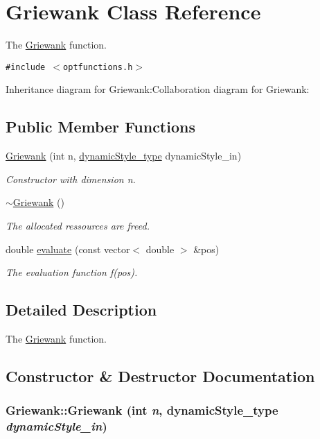 \hypertarget{classGriewank}{
\section{Griewank Class Reference}
\label{classGriewank}
}
The \hyperlink{classGriewank}{Griewank} function.  


{\tt \#include $<$optfunctions.h$>$}

Inheritance diagram for Griewank:Collaboration diagram for Griewank:\subsection*{Public Member Functions}
\begin{CompactItemize}
\item 
\hyperlink{classGriewank_2a659f93f0b1da7fc9fca34fc371d3af}{Griewank} (int n, \hyperlink{optfunctions_8h_ae9aa3a5dd199a43e77abc2cccf4477e}{dynamicStyle\_\-type} dynamicStyle\_\-in)
\begin{CompactList}\small\item\em Constructor with dimension n. \item\end{CompactList}\item 
\hyperlink{classGriewank_f635212f9d2c41fe20b00c474e461743}{$\sim$Griewank} ()
\begin{CompactList}\small\item\em The allocated ressources are freed. \item\end{CompactList}\item 
double \hyperlink{classGriewank_05917918e68b34e9ed3e794388975f6c}{evaluate} (const vector$<$ double $>$ \&pos)
\begin{CompactList}\small\item\em The evaluation function f(pos). \item\end{CompactList}\end{CompactItemize}


\subsection{Detailed Description}
The \hyperlink{classGriewank}{Griewank} function. 

\subsection{Constructor \& Destructor Documentation}
\hypertarget{classGriewank_2a659f93f0b1da7fc9fca34fc371d3af}{
\subsubsection{\setlength{\rightskip}{0pt plus 5cm}Griewank::Griewank (int {\em n}, \/  {\bf dynamicStyle\_\-type} {\em dynamicStyle\_\-in})}}
\label{classGriewank_2a659f93f0b1da7fc9fca34fc371d3af}


